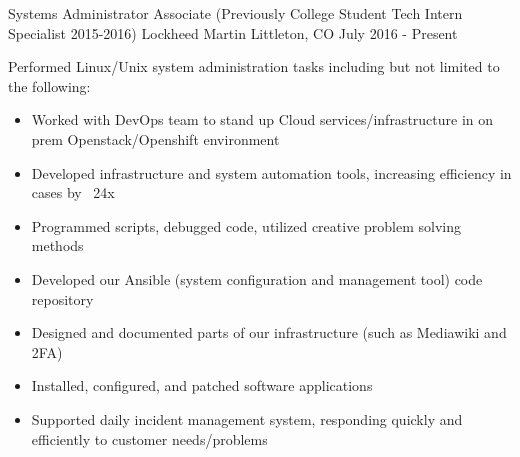 


\begin{cventries}
\vspace{-.25em}
\cventry
{Systems Administrator Associate (Previously College Student Tech Intern Specialist 2015-2016)} %
{Lockheed Martin} %
{Littleton, CO} %
{July 2016 - Present} %
{ %
\begin{cvitems}
\item {Performed Linux/Unix system administration tasks including but not limited to the following:}
  \begin{itemize}
  \item{Worked with DevOps team to stand up Cloud services/infrastructure in on prem Openstack/Openshift environment}
  \item{Developed infrastructure and system automation tools, increasing efficiency in cases by ~24x}
  \item{Programmed scripts, debugged code, utilized creative problem solving methods}
  \item{Developed our Ansible (system configuration and management tool) code repository}
  \item{Designed and documented parts of our infrastructure (such as Mediawiki and 2FA)}
  \item{Installed, configured, and patched software applications}
  \item{Supported daily incident management system, responding quickly and efficiently to customer needs/problems}
  \end{itemize}
\end{cvitems}
}


\end{cventries}
